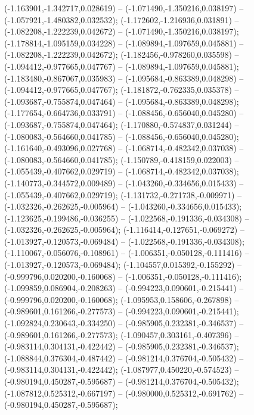  (-1.163901,-1.342717,0.028619) -- (-1.071490,-1.350216,0.038197) -- (-1.057921,-1.480382,0.032532);
 (-1.172602,-1.216936,0.031891) -- (-1.082208,-1.222239,0.042672) -- (-1.071490,-1.350216,0.038197);
 (-1.178814,-1.095159,0.034228) -- (-1.089894,-1.097659,0.045881) -- (-1.082208,-1.222239,0.042672);
 (-1.182456,-0.978260,0.035598) -- (-1.094412,-0.977665,0.047767) -- (-1.089894,-1.097659,0.045881);
 (-1.183480,-0.867067,0.035983) -- (-1.095684,-0.863389,0.048298) -- (-1.094412,-0.977665,0.047767);
 (-1.181872,-0.762335,0.035378) -- (-1.093687,-0.755874,0.047464) -- (-1.095684,-0.863389,0.048298);
 (-1.177654,-0.664736,0.033791) -- (-1.088456,-0.656040,0.045280) -- (-1.093687,-0.755874,0.047464);
 (-1.170880,-0.574837,0.031244) -- (-1.080083,-0.564660,0.041785) -- (-1.088456,-0.656040,0.045280);
 (-1.161640,-0.493096,0.027768) -- (-1.068714,-0.482342,0.037038) -- (-1.080083,-0.564660,0.041785);
 (-1.150789,-0.418159,0.022003) -- (-1.055439,-0.407662,0.029719) -- (-1.068714,-0.482342,0.037038);
 (-1.140773,-0.344572,0.009489) -- (-1.043260,-0.334656,0.015433) -- (-1.055439,-0.407662,0.029719);
 (-1.131732,-0.271738,-0.009971) -- (-1.032326,-0.262625,-0.005964) -- (-1.043260,-0.334656,0.015433);
 (-1.123625,-0.199486,-0.036255) -- (-1.022568,-0.191336,-0.034308) -- (-1.032326,-0.262625,-0.005964);
 (-1.116414,-0.127651,-0.069272) -- (-1.013927,-0.120573,-0.069484) -- (-1.022568,-0.191336,-0.034308);
 (-1.110067,-0.056076,-0.108961) -- (-1.006351,-0.050128,-0.111416) -- (-1.013927,-0.120573,-0.069484);
 (-1.104557,0.015392,-0.155292) -- (-0.999796,0.020200,-0.160068) -- (-1.006351,-0.050128,-0.111416);
 (-1.099859,0.086904,-0.208263) -- (-0.994223,0.090601,-0.215441) -- (-0.999796,0.020200,-0.160068);
 (-1.095953,0.158606,-0.267898) -- (-0.989601,0.161266,-0.277573) -- (-0.994223,0.090601,-0.215441);
 (-1.092824,0.230643,-0.334250) -- (-0.985905,0.232381,-0.346537) -- (-0.989601,0.161266,-0.277573);
 (-1.090457,0.303161,-0.407396) -- (-0.983114,0.304131,-0.422442) -- (-0.985905,0.232381,-0.346537);
 (-1.088844,0.376304,-0.487442) -- (-0.981214,0.376704,-0.505432) -- (-0.983114,0.304131,-0.422442);
 (-1.087977,0.450220,-0.574523) -- (-0.980194,0.450287,-0.595687) -- (-0.981214,0.376704,-0.505432);
 (-1.087812,0.525312,-0.667197) -- (-0.980000,0.525312,-0.691762) -- (-0.980194,0.450287,-0.595687);
